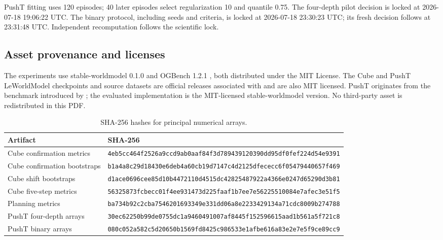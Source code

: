 \documentclass{article}
\newcommand{\hash}[1]{\texttt{#1}}
\begin{document}
PushT fitting uses 120 episodes; 40 later episodes select regularization 10 and quantile 0.75. The four-depth pilot decision is locked at 2026-07-18 19:06:22 UTC. The binary protocol, including seeds and criteria, is locked at 2026-07-18 23:30:23 UTC; its fresh decision follows at 23:31:48 UTC. Independent recomputation follows the scientific lock.

\subsection{Asset provenance and licenses}

The experiments use stable-worldmodel 0.1.0 \citep{maes2026stableworldmodel} and OGBench 1.2.1 \citep{park2025ogbench}, both distributed under the MIT License. The Cube and PushT LeWorldModel checkpoints and source datasets are official releases associated with \citet{maes2026leworldmodel} and are also MIT licensed. PushT originates from the benchmark introduced by \citet{chi2023diffusion}; the evaluated implementation is the MIT-licensed stable-worldmodel version. No third-party asset is redistributed in this PDF.

\begin{table}[h]
\centering
\caption{SHA-256 hashes for principal numerical arrays.}
\label{tab:hashes}
\scriptsize
\begin{tabular}{@{}p{} p{}@{}}
\toprule
Artifact & SHA-256 \\
\midrule
Cube confirmation metrics & \hash{4eb5cc464f2526a9ccd9ab0aaf84f3d789439120390dd95df0fef224d54e9391} \\
Cube confirmation bootstraps & \hash{b1a4a8c29d18430e6deb4a60cb19d7147c4d2125dfececc6f05479440657f469} \\
Cube shift bootstraps & \hash{d1ace0696cee85d10b4472110d4515dc42825487922a4366e0247d65290d3b81} \\
Cube five-step metrics & \hash{56325873fcbecc01f4ee931473d225faaf1b7ee7e56225510084e7afec3e51f5} \\
Planning metrics & \hash{ba734b92c2cba7546201693349e331dd06a8e2233429134a71cdc8009b274788} \\
PushT four-depth arrays & \hash{30ec62250b99de0755dc1a9460491007af8445f152596615aad1b561a5f721c8} \\
PushT binary arrays & \hash{080c052a582c5d20650b1569fd8425c986533e1afbe616a83e2e7e5f9ce89cc9} \\
\bottomrule
\end{tabular}
\end{table}


\end{document}
